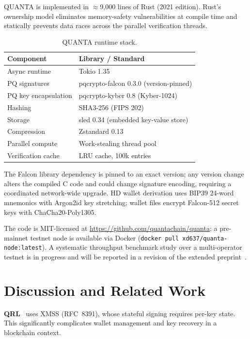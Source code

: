 \documentclass[11pt,a4paper]{article}
\begin{document}
QUANTA is implemented in $\approx$9,000 lines of Rust (2021 edition).
Rust's ownership model eliminates memory-safety vulnerabilities at compile
time and statically prevents data races across the parallel verification
threads.

\begin{table}[h]
\centering
\begin{tabular}{@{}ll@{}}
\toprule
\textbf{Component} & \textbf{Library / Standard} \\
\midrule
Async runtime        & Tokio 1.35 \\
PQ signatures        & pqcrypto-falcon 0.3.0 (version-pinned) \\
PQ key encapsulation & pqcrypto-kyber 0.8 (Kyber-1024) \\
Hashing              & SHA3-256 (FIPS 202) \\
Storage              & sled 0.34 (embedded key-value store) \\
Compression          & Zstandard 0.13 \\
Parallel compute     & Work-stealing thread pool \\
Verification cache   & LRU cache, 100k entries \\
\bottomrule
\end{tabular}
\caption{QUANTA runtime stack.}
\end{table}

The Falcon library dependency is pinned to an exact version; any version
change alters the compiled C code and could change signature encoding,
requiring a coordinated network-wide upgrade. HD wallet derivation uses
BIP39 24-word mnemonics with Argon2id key stretching; wallet files encrypt
Falcon-512 secret keys with ChaCha20-Poly1305.

The code is MIT-licensed at \url{https://github.com/quantachain/quanta};
a pre-mainnet testnet node is available via Docker
(\texttt{docker pull xd637/quanta-node:latest}).
A systematic throughput benchmark study over a multi-operator testnet is
in progress and will be reported in a revision of the extended
preprint~\cite{quanta2026}.

\section{Discussion and Related Work}

\textbf{QRL}~\cite{hulsing2018} uses XMSS (RFC~8391), whose stateful
signing requires per-key state. This significantly complicates wallet
management and key recovery in a blockchain context.
\end{document}
